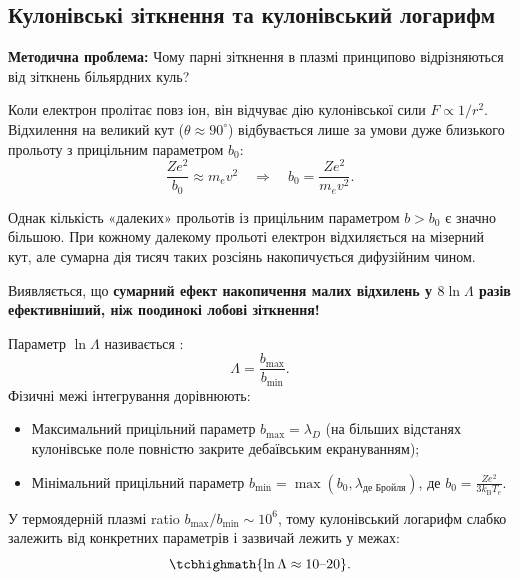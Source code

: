 \subsection{Кулонівські зіткнення та кулонівський логарифм}

\textbf{Методична проблема:} Чому парні зіткнення в плазмі принципово відрізняються від зіткнень більярдних куль?

Коли електрон пролітає повз іон, він відчуває дію кулонівської сили $F \propto 1/r^2$. Відхилення на великий кут ($\theta \approx 90^\circ$) відбувається лише за умови дуже близького прольоту з прицільним параметром $b_0$:
\begin{equation}
	\frac{Z e^2}{b_0} \approx m_e v^2 \quad \Rightarrow \quad b_0 = \frac{Z e^2}{m_e v^2}.
\end{equation}

Однак кількість «далеких» прольотів із прицільним параметром $b > b_0$ є значно більшою. При кожному далекому прольоті електрон відхиляється на мізерний кут, але сумарна дія тисяч таких розсіянь накопичується дифузійним чином.

Виявляється, що \textbf{сумарний ефект накопичення малих відхилень у $8\ln\Lambda$ разів ефективніший, ніж поодинокі лобові зіткнення!}

Параметр $\ln\Lambda$ називається :
\begin{equation}
	\Lambda = \frac{b_{\max}}{b_{\min}}.
\end{equation}
Фізичні межі інтегрування дорівнюють:
\begin{itemize}
	\item Максимальний прицільний параметр $b_{\max} = \lambda_D$ (на більших відстанях кулонівське поле повністю закрите дебаївським екрануванням);
	\item Мінімальний прицільний параметр $b_{\min} = \max(b_0, \lambda_{\text{де Бройля}})$, де $b_0 = \frac{Z e^2}{3 k_{\mathrm B}T_e}$.
\end{itemize}

У термоядерній плазмі ratio $b_{\max}/b_{\min} \sim 10^6$, тому кулонівський логарифм слабко залежить від конкретних параметрів і зазвичай лежить у межах:
\begin{equation}
	\tcbhighmath{\ln\Lambda \approx 10\text{--}20}.
\end{equation}

